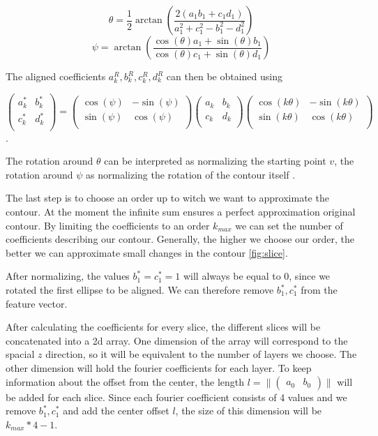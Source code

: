 $$
\theta = \frac{1}{2}\arctan \left( \frac{2(a_1b_1 + c_1d_1)}{a_1^2 + c_1^2 - b_1^2 - d_1^2} \right)
$$
$$
\psi = \arctan \left( \frac{\cos(\theta) a_1 + \sin(\theta) b_1 }{\cos(\theta) c_1 + \sin(\theta) d_1} \right)
$$

The aligned coefficients $a_k^R, b_k^R, c_k^R, d_k^R$ can then be obtained using

$$
\begin{pmatrix}
  a_k^* & b_k^* \\
  c_k^* & d_k^* \\
\end{pmatrix}
=
\begin{pmatrix}
  \cos(\psi) & -\sin(\psi) \\
  \sin(\psi) & \cos(\psi) \\
\end{pmatrix}
\begin{pmatrix}
  a_k & b_k \\
  c_k & d_k \\
\end{pmatrix}
\begin{pmatrix}
  \cos(k\theta ) & -\sin(k\theta) \\
  \sin(k\theta) & \cos(k\theta) \\
\end{pmatrix}
$$.

The rotation around $\theta $ can be interpreted as normalizing the starting point $v$, 
the rotation around $\psi$ as normalizing the rotation of the contour itself \cite{KUHL1982236}.

The last step is to choose an order up to witch we want to approximate the contour.
At the moment the infinite sum ensures a perfect approximation original contour. 
By limiting the coefficients to an order $k_{max}$ we can set the number of coefficients describing our contour.
Generally, the higher we choose our order, the better we can approximate small changes in the contour \ref{fig:slice}.

After normalizing, the values $b_1^* = c_1^* = 1$ will always be equal to 0, since we rotated the first ellipse to be aligned.
We can therefore remove $b_1^*, c_1^*$ from the feature vector.

After calculating the coefficients for every slice, the different slices will be concatenated into a 2d array.
One dimension of the array will correspond to the spacial $z$ direction, so it will be equivalent to the number of layers we choose.
The other dimension will hold the fourier coefficients for each layer.
To keep information about the offset from the center, the length $l = \| \begin{pmatrix} a_0 & b_0 \end{pmatrix} \| $ will be added for each slice.
Since each fourier coefficient consists of 4 values and we remove $b_1^*, c_1^*$ and add the center offset $l$, the size of this dimension will be $k_{max} * 4 - 1$.

